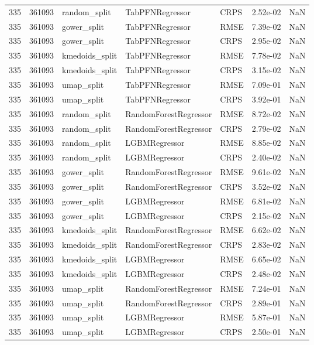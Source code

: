 \begin{tabular}{rrlllrr}
335 & 361093 & random\_split & TabPFNRegressor & CRPS & 2.52e-02 & NaN \\
335 & 361093 & gower\_split & TabPFNRegressor & RMSE & 7.39e-02 & NaN \\
335 & 361093 & gower\_split & TabPFNRegressor & CRPS & 2.95e-02 & NaN \\
335 & 361093 & kmedoids\_split & TabPFNRegressor & RMSE & 7.78e-02 & NaN \\
335 & 361093 & kmedoids\_split & TabPFNRegressor & CRPS & 3.15e-02 & NaN \\
335 & 361093 & umap\_split & TabPFNRegressor & RMSE & 7.09e-01 & NaN \\
335 & 361093 & umap\_split & TabPFNRegressor & CRPS & 3.92e-01 & NaN \\
335 & 361093 & random\_split & RandomForestRegressor & RMSE & 8.72e-02 & NaN \\
335 & 361093 & random\_split & RandomForestRegressor & CRPS & 2.79e-02 & NaN \\
335 & 361093 & random\_split & LGBMRegressor & RMSE & 8.85e-02 & NaN \\
335 & 361093 & random\_split & LGBMRegressor & CRPS & 2.40e-02 & NaN \\
335 & 361093 & gower\_split & RandomForestRegressor & RMSE & 9.61e-02 & NaN \\
335 & 361093 & gower\_split & RandomForestRegressor & CRPS & 3.52e-02 & NaN \\
335 & 361093 & gower\_split & LGBMRegressor & RMSE & 6.81e-02 & NaN \\
335 & 361093 & gower\_split & LGBMRegressor & CRPS & 2.15e-02 & NaN \\
335 & 361093 & kmedoids\_split & RandomForestRegressor & RMSE & 6.62e-02 & NaN \\
335 & 361093 & kmedoids\_split & RandomForestRegressor & CRPS & 2.83e-02 & NaN \\
335 & 361093 & kmedoids\_split & LGBMRegressor & RMSE & 6.65e-02 & NaN \\
335 & 361093 & kmedoids\_split & LGBMRegressor & CRPS & 2.48e-02 & NaN \\
335 & 361093 & umap\_split & RandomForestRegressor & RMSE & 7.24e-01 & NaN \\
335 & 361093 & umap\_split & RandomForestRegressor & CRPS & 2.89e-01 & NaN \\
335 & 361093 & umap\_split & LGBMRegressor & RMSE & 5.87e-01 & NaN \\
335 & 361093 & umap\_split & LGBMRegressor & CRPS & 2.50e-01 & NaN \\

\end{tabular}
